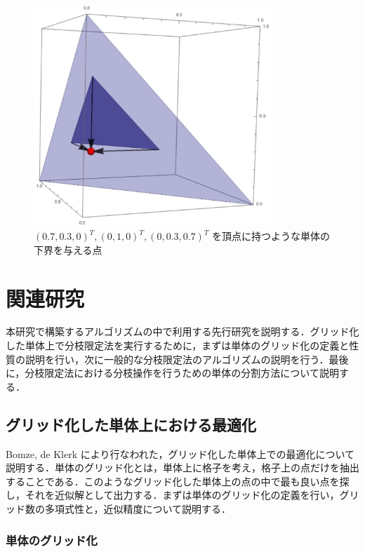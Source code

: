 \documentclass[a4paper,11pt]{jreport}
\begin{document}
\begin{figure}
\begin{center}
\includegraphics[width=9cm]{graphs/lower_bound_of_simplex.pdf}
\caption{$ (0.7, 0.3, 0)^T, (0, 1, 0)^T, (0, 0.3, 0.7)^T $ を頂点に持つような単体の下界を与える点}
\label{fig:lower_bound_of_simplex}
\end{center}
\end{figure}

\chapter{関連研究}

本研究で構築するアルゴリズムの中で利用する先行研究を説明する．グリッド化した単体上で分枝限定法を実行するために，まずは単体のグリッド化の定義と性質の説明を行い，次に一般的な分枝限定法のアルゴリズムの説明を行う．最後に，分枝限定法における分枝操作を行うための単体の分割方法について説明する．

\section{グリッド化した単体上における最適化} \label{sec:gridize_simplex}
Bomze, de Klerk \cite{bomze} により行なわれた，グリッド化した単体上での最適化について説明する．単体のグリッド化とは，単体上に格子を考え，格子上の点だけを抽出することである．このようなグリッド化した単体上の点の中で最も良い点を探し，それを近似解として出力する．まずは単体のグリッド化の定義を行い，グリッド数の多項式性と，近似精度について説明する．\par

\subsection{単体のグリッド化}
\end{document}
